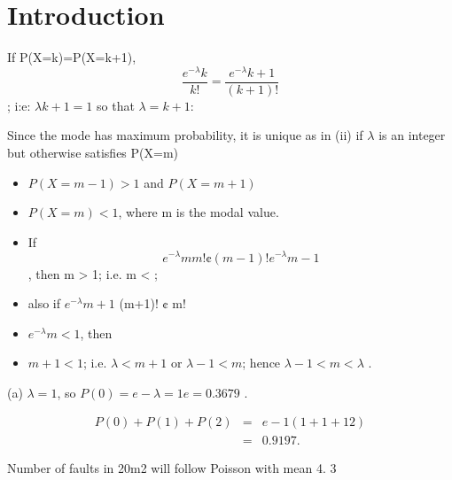 \documentclass[a4paper,12pt]{article}
\begin{document}
\section{Introduction}


\item If P(X=k)=P(X=k+1), \[\frac{e^{-\lambda}k}{
k!} = \frac{e^{-\lambda}k+1}{(k+1)!}\] ; i:e: ${\lambda}
k+1 = 1$ so that ${\lambda} = k + 1:$
\item Since the mode has maximum probability, it is unique as in (ii) if ${\lambda}$ is an integer but otherwise
satisfies P(X=m)

\begin{itemize}
    \item $P(X=m-1) > 1$ and $P(X=m+1)$
\item $P(X=m) < 1$, where m is the modal value.
\item If \[e^{-\lambda}m
m! ¢ (m-1)!
e^{-\lambda}m-1 \], then {\lambda}
m > 1; i.e. m < {\lambda};
\item also if $e^{-\lambda}m+1$
(m+1)! ¢ m!
\item $e^{-\lambda}m < 1$, then {\lambda}
\item $m+1 < 1$; i.e. ${\lambda} < m + 1$ or ${\lambda} - 1 < m $;
hence ${\lambda} - 1 < m < {\lambda}$ .
\end{itemize}

\item (a) ${\lambda} = 1$, so $P(0)=e-{\lambda}=1
e =0.3679$ .
\item 
\begin{eqnarray}
P(0)+P(1)+P(2)&=&e-1(1+1+1
2)\\ &=& 0.9197 .
\end{eqnarray}
\item Number of faults in 20m2 will follow Poisson with mean 4.
3
\item 
\end{document}
